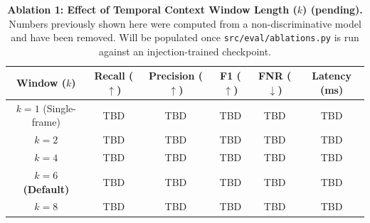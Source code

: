 \begin{table}[h]
\centering
\caption{\textbf{Ablation 1: Effect of Temporal Context Window Length ($k$) (pending).} Numbers previously shown here were computed from a non-discriminative model and have been removed. Will be populated once \texttt{src/eval/ablations.py} is run against an injection-trained checkpoint.}
\label{tab:ablation_temporal}
\begin{tabular}{cccccc}
\toprule
\textbf{Window ($k$)} & \textbf{Recall ($\uparrow$)} & \textbf{Precision ($\uparrow$)} & \textbf{F1 ($\uparrow$)} & \textbf{FNR ($\downarrow$)} & \textbf{Latency (ms)} \\
\midrule
$k=1$ (Single-frame) & TBD & TBD & TBD & TBD & TBD \\
$k=2$ & TBD & TBD & TBD & TBD & TBD \\
$k=4$ & TBD & TBD & TBD & TBD & TBD \\
\textbf{$k=6$ (Default)} & TBD & TBD & TBD & TBD & TBD \\
$k=8$ & TBD & TBD & TBD & TBD & TBD \\
\bottomrule
\end{tabular}
\end{table}
